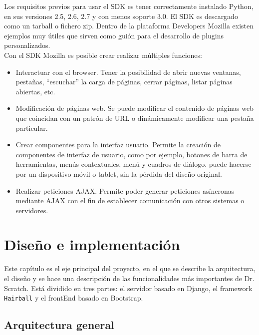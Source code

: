 \documentclass[a4paper, 12pt]{book}
\begin{document}
Los requisitos previos para usar el SDK es tener correctamente instalado Python, en sus versiones
2.5, 2.6, 2.7 y con menos soporte 3.0. El SDK es descargado como un tarball o fichero zip. 
Dentro de la plataforma Developers Mozilla existen ejemplos muy útiles que sirven como guión para
el desarrollo de plugins personalizados. \\

Con el SDK Mozilla es posible crear realizar múltiples funciones:

\begin{itemize}
  \item Interactuar con el browser. Tener la posibilidad de abrir nuevas ventanas, pestañas, "`escuchar"' la
	carga de páginas, cerrar páginas, listar páginas abiertas, etc.
  \item Modificación de páginas web. Se puede modificar el contenido de páginas web que coincidan con un patrón
	de URL o dinámicamente modificar una pestaña particular.
  \item Crear componentes para la interfaz usuario. Permite la creación de componentes de interfaz de usuario, como
	por ejemplo, botones de barra de herramientas, menús contextuales, menú y cuadros de diálogo.
	puede hacerse por un dispositivo móvil o tablet, sin la pérdida del diseño original. 
	\item Realizar peticiones AJAX. Permite poder generar peticiones asíncronas mediante AJAX con el fin de establecer
	comunicación con otros sistemas o servidores.
\end{itemize}



\cleardoublepage
\chapter{Diseño e implementación}

Este capítulo es el eje principal del proyecto, en el que se describe la arquitectura,
el diseño y se hace una descripción de las funcionalidades más importantes de Dr.
Scratch. Está dividido en tres partes: el servidor basado en Django, el framework
\texttt{Hairball} y el frontEnd basado en Bootstrap.


\section{Arquitectura general}
\label{sec:arquitectura}
\end{document}
